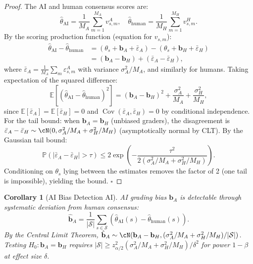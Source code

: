 \documentclass[11pt,a4paper]{article}
\newtheorem{corollary}[theorem]{Corollary}
\theoremstyle{definition}
\theoremstyle{remark}
\DeclareMathOperator{\Cov}{Cov}
\newcommand{\E}{\mathbb{E}}
\newcommand{\Pbb}{\mathbb{P}}
\newcommand{\cS}{\mathcal{S}}
\newcommand{\studentSet}{\cS}
\newcommand{\trueScore}{\theta}
\newcommand{\biasVec}{\mathbf{b}}
\begin{document}
\begin{proof}
The AI and human consensus scores are:
\begin{equation}
    \hat{\theta}_{\text{AI}} = \frac{1}{M_A}\sum_{m=1}^{M_A} v_{s,m}^A, \quad \hat{\theta}_{\text{human}} = \frac{1}{M_H}\sum_{m=1}^{M_H} v_{s,m}^H.
\end{equation}
By the scoring production function (equation for $v_{s,m}$):
\begin{align}
    \hat{\theta}_{\text{AI}} - \hat{\theta}_{\text{human}} &= (\trueScore_s + \biasVec_A + \bar{\varepsilon}_A) - (\trueScore_s + \biasVec_H + \bar{\varepsilon}_H) \\
    &= (\biasVec_A - \biasVec_H) + (\bar{\varepsilon}_A - \bar{\varepsilon}_H),
\end{align}
where $\bar{\varepsilon}_A = \frac{1}{M_A}\sum_m \varepsilon_{s,m}^A$ with variance $\sigma_A^2/M_A$, and similarly for humans.
Taking expectation of the squared difference:
\begin{equation}
    \E[(\hat{\theta}_{\text{AI}} - \hat{\theta}_{\text{human}})^2] = (\biasVec_A - \biasVec_H)^2 + \frac{\sigma_A^2}{M_A} + \frac{\sigma_H^2}{M_H},
\end{equation}
since $\E[\bar{\varepsilon}_A] = \E[\bar{\varepsilon}_H] = 0$ and $\Cov(\bar{\varepsilon}_A, \bar{\varepsilon}_H) = 0$ by conditional independence.
For the tail bound: when $\biasVec_A = \biasVec_H$ (unbiased graders), the disagreement is $\bar{\varepsilon}_A - \bar{\varepsilon}_H \sim \cN(0, \sigma_A^2/M_A + \sigma_H^2/M_H)$ (asymptotically normal by CLT). By the Gaussian tail bound:
\begin{equation}
    \Pbb(|\bar{\varepsilon}_A - \bar{\varepsilon}_H| > \tau) \le 2\exp\left(-\frac{\tau^2}{2(\sigma_A^2/M_A + \sigma_H^2/M_H)}\right).
\end{equation}
Conditioning on $\trueScore_s$ lying between the estimates removes the factor of 2 (one tail is impossible), yielding the bound. \hfill $\square$
\end{proof}
\begin{corollary}[AI Bias Detection AI]
\label{cor:ai_bias}
AI grading bias $\biasVec_A$ is detectable through systematic deviation from human consensus:
\begin{equation}
    \hat{\biasVec}_A = \frac{1}{|\studentSet|}\sum_{s \in \studentSet} (\hat{\theta}_{\text{AI}}(s) - \hat{\theta}_{\text{human}}(s)).
\end{equation}
By the Central Limit Theorem, $\hat{\biasVec}_A \sim \cN(\biasVec_A - \biasVec_H, (\sigma_A^2/M_A + \sigma_H^2/M_H)/|\studentSet|)$. Testing $H_0: \biasVec_A = \biasVec_H$ requires $|\studentSet| \ge z_{\alpha/2}^2 (\sigma_A^2/M_A + \sigma_H^2/M_H) / \delta^2$ for power $1-\beta$ at effect size $\delta$.
\end{corollary}
\end{document}
